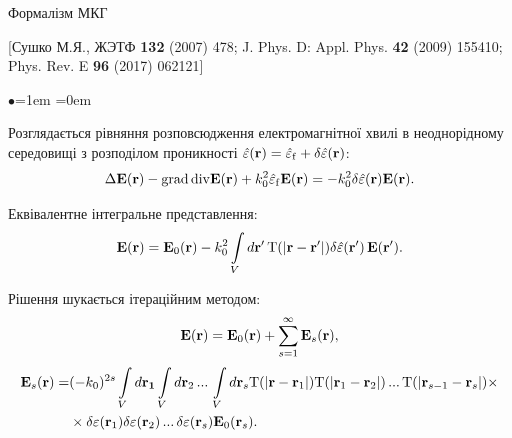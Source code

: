 \documentclass[10pt]{beamer}
\begin{document}
\begin{frame}{Формалізм МКГ}
\footnotesize

[Сушко М.Я., ЖЭТФ {\bf 132} (2007) 478; J. Phys. D: Appl. Phys. {\bf 42} (2009) 155410; Phys. Rev. E {\bf 96} (2017) 062121]

\begin{list}{$\bullet$}{\leftmargin=1em \itemindent=0em}
\item
Розглядається рівняння розповсюдження електромагнітної хвилі в неоднорідному середовищі з розподілом проникності $\hat{\varepsilon}({\bf r}) = \hat{\varepsilon}_{\rm f} + \delta\hat{\varepsilon}({\bf r})$:
\begin{equation} \label{eq:propogate_eq}
\Delta {\bf E} ({\bf r}) - {\rm grad}\, {\rm div} {\bf E} ({\bf r}) + k_0^{2}\hat{\varepsilon}_{\rm f} {\bf E} ({\bf r})  = - k_{0}^{2} \delta
\hat{\varepsilon} ({\bf r}) {\bf E} ({\bf r}).
\end{equation}

\item 
Еквівалентне інтегральне представлення:
\begin{equation}\label{eq:integral_field}
{\bf E}({\rm {\bf r}}) = {\bf E}_{0} ({\bf r}) -
k_{0}^{2} \int\limits_{V} d{\bf r}'\, {\rm T}(|{\bf r} - {\bf r}'|)
\delta \hat{\varepsilon} ({\bf r}')\, {\bf E}({\bf r}').
\end{equation}

\item 
Рішення шукається ітераційним методом:
\begin{equation}\label{eq:iterationE}
{\bf E} ({\bf r}) = {\bf E}_0 ({\bf r}) +
\sum\limits_{s=1}^{\infty} {\bf E}_s ({\bf r}),
\end{equation}
\begin{equation*}
\begin{split}
{\bf E}_s ({\bf r}) =& (- k_0)^{2s} \int\limits_V d{\bf r_1}
\int\limits_V d{\bf r}_2 \,...\, \int\limits_V d{\bf r}_s
{\rm T}(|{\bf r} - {\bf r}_1|) {\rm T}(|{\bf r}_1 - {\bf r}_2|)
\,...\, {\rm T}(|{\bf r}_{s-1} - {\bf r}_s|) \times \\
&\times \delta{\varepsilon} ({\bf r}_1) \delta{\varepsilon} ({\bf r}_2)
\,...\, \delta{\varepsilon} ({\bf r}_s) {\bf E}_0 ({\bf r}_s).
\end{split}
\end{equation*}

\end{list}

\end{frame}
\end{document}
